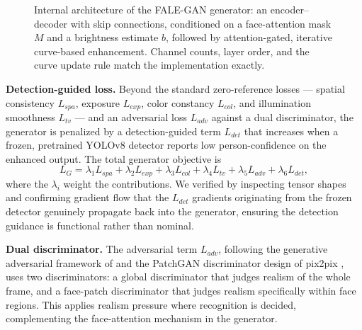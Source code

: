 \documentclass[conference]{IEEEtran}
\begin{document}
\begin{figure}[t]
{%
}
\caption{Internal architecture of the FALE-GAN generator: an
encoder--decoder with skip connections, conditioned on a face-attention
mask $M$ and a brightness estimate $b$, followed by attention-gated,
iterative curve-based enhancement. Channel counts, layer order, and the
curve update rule match the implementation exactly.}
\label{fig:generator_internal}
\end{figure}

\textbf{Detection-guided loss.} Beyond the standard zero-reference
losses --- spatial consistency $L_{spa}$, exposure $L_{exp}$, color
constancy $L_{col}$, and illumination smoothness $L_{tv}$ --- and
an adversarial loss $L_{adv}$ against a dual discriminator, the
generator is penalized by a detection-guided term $L_{det}$ that
increases when a frozen, pretrained YOLOv8 detector reports low
person-confidence on the enhanced output. The total generator
objective is
\begin{equation}
L_{G} = \lambda_{1}L_{spa} + \lambda_{2}L_{exp} +
\lambda_{3}L_{col} + \lambda_{4}L_{tv} + \lambda_{5}L_{adv} +
\lambda_{6}L_{det},
\label{eq:total}
\end{equation}
where the $\lambda_i$ weight the contributions. We verified by
inspecting tensor shapes and confirming gradient flow that the
$L_{det}$ gradients originating from the frozen detector
genuinely propagate back into the generator, ensuring the
detection guidance is functional rather than nominal.

\textbf{Dual discriminator.} The adversarial term $L_{adv}$,
following the generative adversarial framework of
\cite{goodfellow2014} and the PatchGAN discriminator design of
pix2pix \cite{pix2pix}, uses two discriminators: a global discriminator that judges realism of
the whole frame, and a face-patch discriminator that judges
realism specifically within face regions. This applies realism
pressure where recognition is decided, complementing the
face-attention mechanism in the generator.
\end{document}
